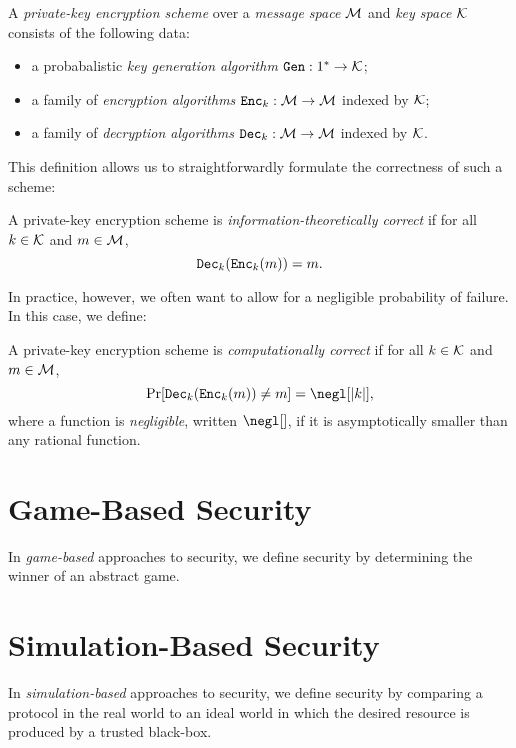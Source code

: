 \begin{dfn}
	A \emph{private-key encryption scheme} over a \emph{message space} $\mathcal{M}$ and
	\emph{key space} $\mathcal{K}$ consists of the following data:
	\begin{itemize}
		\item a probabalistic \emph{key generation algorithm}\footnotemark{}
		      ${\texttt{Gen}}: 1^*\rightarrow \mathcal{K}$;
		\item a family of \emph{encryption algorithms} ${\texttt{Enc}}_k: \mathcal{M}\rightarrow
			      \mathcal{M}$ indexed by $\mathcal{K}$;
		\item a family of \emph{decryption algorithms} ${\texttt{Dec}}_k:
			      \mathcal{M}\rightarrow\mathcal{M}$ indexed by $\mathcal{K}$.	\end{itemize}
\end{dfn}

This definition allows us to straightforwardly formulate the correctness
of such a scheme:

\begin{dfn}
	A private-key encryption scheme is \emph{information-theoretically correct} if
	for all $k\in \mathcal{K}$ and $m\in \mathcal{M}$, \[
		{\texttt{Dec}}_k({\texttt{Enc}}_k(m)) = m.
	\]
\end{dfn}

\noindent
In practice, however, we often want to allow for a negligible probability of
failure. In this case, we define:

\begin{dfn}
	A private-key encryption scheme is \emph{computationally correct} if
	for all $k\in \mathcal{K}$ and $m\in \mathcal{M}$, \[
		\Pr[\alg{Dec}_k(\alg{Enc}_k(m)) \neq m] = \negl[|k|],
	\]where a function is \emph{negligible}, written $\negl[]$, if it is
	asymptotically smaller than any rational function.
\end{dfn}
\section{Game-Based Security}

In \emph{game-based} approaches to security, we define security by determining
the winner of an abstract game.

\section{Simulation-Based Security}

In \emph{simulation-based} approaches to security, we define security by
comparing a protocol in the real world to an ideal world in which the desired
resource is produced by a trusted black-box.
